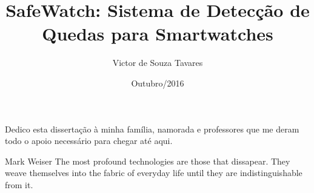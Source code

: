 \documentclass[pt,twoside,onehalfspacing,bsc]{risethesis}
\title{SafeWatch: Sistema de Detecção de Quedas para Smartwatches}
\date{Outubro/2016}
\author{Victor de Souza Tavares}
\begin{document}
\frontmatter
\frontpage
\presentationpage

\begin{dedicatory}
Dedico esta dissertação à minha família, namorada e professores que me deram todo o apoio necessário para chegar até aqui.
\end{dedicatory}

\begin{epigraph}[]{Mark Weiser}
The most profound technologies are those that dissapear. They weave themselves into the fabric of everyday life until they are indistinguishable from it.
\end{epigraph}

\resumo


\abstract


\tableofcontents

\listoffigures

\listoftables

\listofacronyms


\lstlistoflistings

\mainmatter











%
\end{document}

